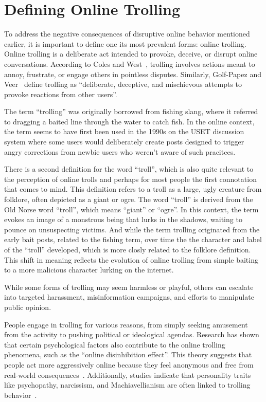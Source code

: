 \documentclass[twoside]{ctuthesis}
\theoremstyle{plain}
\theoremstyle{definition}
\theoremstyle{note}
\begin{document}
\section{Defining Online Trolling}
To address the negative consequences of disruptive online behavior mentioned earlier, it is important to define one its most prevalent forms: online trolling. Online trolling is a deliberate act intended to provoke, deceive, or disrupt online conversations. According to Coles and West~\cite{Coles2016}, trolling involves actions meant to annoy, frustrate, or engage others in pointless disputes. Similarly, Golf-Papez and Veer~\cite{GolfPapez2017DontFeedTheTroll} define trolling as ``deliberate, deceptive, and mischievous attempts to provoke reactions from other users''.\par
The term ``trolling'' was originally borrowed from fishing slang, where it referred to dragging a baited line through the water to catch fish. In the online context, the term seems to have first been used  in the 1990s on the USET discussion system where some users would deliberately create posts designed to trigger angry corrections from newbie users who weren't aware of such pracitces.\par

There is a second definition for the word ``troll'', which is also quite relevant to the perception of online trolls and perhaps for most people the first connotation that comes to mind. This definition refers to a troll as a large, ugly creature from folklore, often depicted as a giant or ogre. The word ``troll'' is derived from the Old Norse word ``troll'', which means ``giant'' or ``ogre''. In this context, the term evokes an image of a monstrous being that lurks in the shadows, waiting to pounce on unsuspecting victims. And while the term trolling originated from the early bait posts, related to the fishing term, over time the the character and label of the ``troll'' developed, which is more closly related to the folklore definition. This shift in meaning reflects the evolution of online trolling from simple baiting to a more malicious character lurking on the internet.\cite{Demsar2021}\par

While some forms of trolling may seem harmless or playful, others can escalate into targeted harassment, misinformation campaigns, and efforts to manipulate public opinion.\par
People engage in trolling for various reasons, from simply seeking amusement from the activity to pushing political or ideological agendas. Research has shown that certain psychological factors also contribute to the online trolling phenomena, such as the ``online disinhibition effect''. This theory suggests that people act more aggressively online because they feel anonymous and free from real-world consequences~\cite{Suler2004}. Additionally, studies indicate that personality traits like psychopathy, narcissism, and Machiavellianism are often linked to trolling behavior~\cite{Buckels2014TrollsWantToHaveFun}.\par
\end{document}
